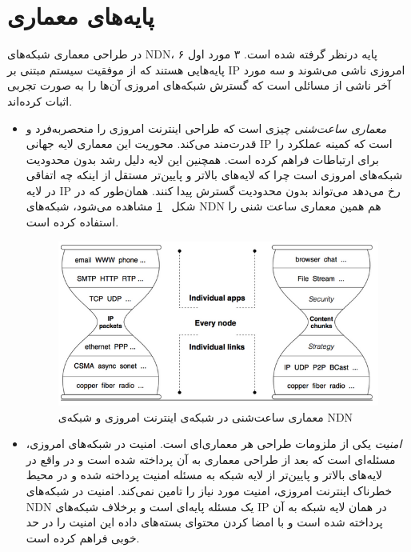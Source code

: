 \section{پایه‌های معماری}
در طراحی معماری شبکه‌های NDN، ۶ پایه درنظر گرفته شده است. ۳ مورد اول پایه‌هایی هستند که از موفقیت سیستم مبتنی بر IP امروزی ناشی می‌شوند و سه مورد آخر ناشی از مسائلی است که گسترش شبکه‌های امروزی آن‌ها را به صورت تجربی اثبات کرده‌اند. 
\begin{itemize}
\item{
\textit{معماری ساعت‌شنی}
 چیزی است که طراحی اینترنت امروزی را منحصربه‌فرد و قدرت‌مند می‌کند. محوریت این معماری لایه جهانی IP  است که کمینه عملکرد را برای ارتباطات فراهم کرده است. همچنین این لایه دلیل رشد بدون محدودیت شبکه‌های امروزی است چرا که لایه‌های بالاتر و پایین‌تر مستقل از اینکه چه اتفاقی در لایه IP  رخ می‌دهد می‌تواند بدون محدودیت گسترش پیدا کنند. همان‌طور که در شکل
~\ref{fig:hourglass}
  مشاهده می‌شود، شبکه‌های NDN هم همین معماری ساعت شنی را استفاده کرده است. 


\begin{figure}[H]
\centering
\includegraphics[scale=0.55]{./resources/figures/3_hourglass.png}
\caption{معماری ساعت‌شنی در شبکه‌‌ی اینترنت امروزی و شبکه‌ی NDN}
\label{fig:hourglass}
\end{figure}




} 

\item{
\textit{امنیت}
 یکی از ملزومات طراحی هر معماری‌ای است. امنیت در شبکه‌های امروزی، مسئله‌ای است که بعد از طراحی معماری به آن پرداخته شده است و در واقع در لایه‌های بالاتر و پایین‌تر از لایه شبکه به مسئله امنیت پرداخته شده و در محیط خطرناک اینترنت امروزی، امنیت مورد نیاز را تامین نمی‌کند. امنیت در شبکه‌های NDN یک مسئله پایه‌ای است و برخلاف شبکه‌های IP در همان لایه شبکه به آن پرداخته شده است و با امضا کردن محتوای بسته‌های داده این امنیت را در حد خوبی فراهم کرده است. 

}
\end{itemize}
